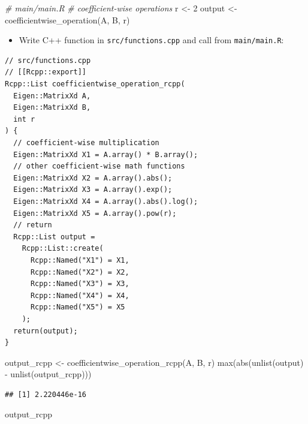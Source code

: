 \documentclass[
]{book}
\newenvironment{Shaded}{\begin{snugshade}}{\end{snugshade}}
\newcommand{\CommentTok}[1]{\textcolor[rgb]{0.56,0.35,0.01}{\textit{#1}}}
\newcommand{\DecValTok}[1]{\textcolor[rgb]{0.00,0.00,0.81}{#1}}
\newcommand{\FunctionTok}[1]{\textcolor[rgb]{0.00,0.00,0.00}{#1}}
\newcommand{\NormalTok}[1]{#1}
\newcommand{\OtherTok}[1]{\textcolor[rgb]{0.56,0.35,0.01}{#1}}
\newcommand{\SpecialCharTok}[1]{\textcolor[rgb]{0.00,0.00,0.00}{#1}}
\providecommand{\tightlist}{%
  \setlength{\itemsep}{0pt}\setlength{\parskip}{0pt}}
\begin{document}
\begin{Shaded}
\begin{Highlighting}[]
\CommentTok{\# main/main.R}
\CommentTok{\# coefficient{-}wise operations}
\NormalTok{r }\OtherTok{\textless{}{-}} \DecValTok{2}
\NormalTok{output }\OtherTok{\textless{}{-}} \FunctionTok{coefficientwise\_operation}\NormalTok{(A, B, r)}
\end{Highlighting}
\end{Shaded}

\begin{itemize}
\tightlist
\item
  Write C++ function in \texttt{src/functions.cpp} and call from \texttt{main/main.R}:
\end{itemize}

\begin{verbatim}
// src/functions.cpp
// [[Rcpp::export]]
Rcpp::List coefficientwise_operation_rcpp(
  Eigen::MatrixXd A,
  Eigen::MatrixXd B,
  int r
) {
  // coefficient-wise multiplication
  Eigen::MatrixXd X1 = A.array() * B.array();
  // other coefficient-wise math functions
  Eigen::MatrixXd X2 = A.array().abs();
  Eigen::MatrixXd X3 = A.array().exp();
  Eigen::MatrixXd X4 = A.array().abs().log();
  Eigen::MatrixXd X5 = A.array().pow(r);
  // return
  Rcpp::List output =
    Rcpp::List::create(
      Rcpp::Named("X1") = X1,
      Rcpp::Named("X2") = X2,
      Rcpp::Named("X3") = X3,
      Rcpp::Named("X4") = X4,
      Rcpp::Named("X5") = X5
    );
  return(output);
}
\end{verbatim}

\begin{Shaded}
\begin{Highlighting}[]
\NormalTok{output\_rcpp }\OtherTok{\textless{}{-}} \FunctionTok{coefficientwise\_operation\_rcpp}\NormalTok{(A, B, r)}
\FunctionTok{max}\NormalTok{(}\FunctionTok{abs}\NormalTok{(}\FunctionTok{unlist}\NormalTok{(output) }\SpecialCharTok{{-}} \FunctionTok{unlist}\NormalTok{(output\_rcpp)))}
\end{Highlighting}
\end{Shaded}

\begin{verbatim}
## [1] 2.220446e-16
\end{verbatim}

\begin{Shaded}
\begin{Highlighting}[]
\NormalTok{output\_rcpp}
\end{Highlighting}
\end{Shaded}
\end{document}
